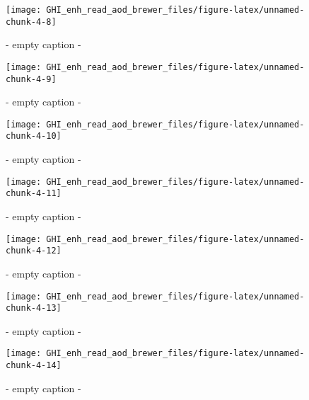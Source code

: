 \documentclass[
  10pt,
  a4paper,oneside]{article}
\begin{document}
\begin{figure}[H]

{\centering \texttt{[image: GHI\_enh\_read\_aod\_brewer\_files/figure-latex/unnamed-chunk-4-8]} 

}

\caption{ - empty caption - }\label{fig:unnamed-chunk-4-8}
\end{figure}
\begin{figure}[H]

{\centering \texttt{[image: GHI\_enh\_read\_aod\_brewer\_files/figure-latex/unnamed-chunk-4-9]} 

}

\caption{ - empty caption - }\label{fig:unnamed-chunk-4-9}
\end{figure}
\begin{figure}[H]

{\centering \texttt{[image: GHI\_enh\_read\_aod\_brewer\_files/figure-latex/unnamed-chunk-4-10]} 

}

\caption{ - empty caption - }\label{fig:unnamed-chunk-4-10}
\end{figure}
\begin{figure}[H]

{\centering \texttt{[image: GHI\_enh\_read\_aod\_brewer\_files/figure-latex/unnamed-chunk-4-11]} 

}

\caption{ - empty caption - }\label{fig:unnamed-chunk-4-11}
\end{figure}
\begin{figure}[H]

{\centering \texttt{[image: GHI\_enh\_read\_aod\_brewer\_files/figure-latex/unnamed-chunk-4-12]} 

}

\caption{ - empty caption - }\label{fig:unnamed-chunk-4-12}
\end{figure}
\begin{figure}[H]

{\centering \texttt{[image: GHI\_enh\_read\_aod\_brewer\_files/figure-latex/unnamed-chunk-4-13]} 

}

\caption{ - empty caption - }\label{fig:unnamed-chunk-4-13}
\end{figure}
\begin{figure}[H]

{\centering \texttt{[image: GHI\_enh\_read\_aod\_brewer\_files/figure-latex/unnamed-chunk-4-14]} 

}

\caption{ - empty caption - }\label{fig:unnamed-chunk-4-14}
\end{figure}
\end{document}
